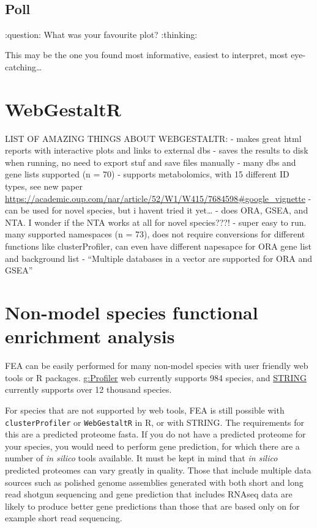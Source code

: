 \documentclass[
]{book}
\begin{document}
~

\hypertarget{poll}{%
\section{Poll}\label{poll}}

:question: What was your favourite plot? :thinking:

This may be the one you found most informative, easiest to interpret, most eye-catching\ldots{}

\hypertarget{webgestaltr}{%
\chapter{WebGestaltR}\label{webgestaltr}}

LIST OF AMAZING THINGS ABOUT WEBGESTALTR:
- makes great html reports with interactive plots and links to external dbs
- saves the results to disk when running, no need to export stuf and save files manually
- many dbs and gene lists supported (n = 70)
- supports metabolomics, with 15 different ID types, see new paper \url{https://academic.oup.com/nar/article/52/W1/W415/7684598\#google_vignette}
- can be used for novel species, but i havent tried it yet\ldots{}
- does ORA, GSEA, and NTA. I wonder if the NTA works at all for novel species???!
- super easy to run. many supported namespaces (n = 73), does not require conversions for different functions like clusterProfiler, can even have different napesapce for ORA gene list and background list
- ``Multiple databases in a vector are supported for ORA and GSEA''

\hypertarget{non-model-species-functional-enrichment-analysis}{%
\chapter{Non-model species functional enrichment analysis}\label{non-model-species-functional-enrichment-analysis}}

FEA can be easily performed for many non-model species with user friendly web tools or R packages. \href{https://biit.cs.ut.ee/gprofiler/gost}{g:Profiler} web currently supports 984 species, and \href{https://string-db.org/}{STRING} currently supports over 12 thousand species.

For species that are not supported by web tools, FEA is still possible with \texttt{clusterProfiler} or \texttt{WebGestaltR} in R, or with STRING. The requirements for this are a predicted proteome fasta. If you do not have a predicted proteome for your species, you would need to perform gene prediction, for which there are a number of \emph{in silico} tools available. It must be kept in mind that \emph{in silico} predicted proteomes can vary greatly in quality. Those that include multiple data sources such as polished genome assemblies generated with both short and long read shotgun sequencing and gene prediction that includes RNAseq data are likely to produce better gene predictions than those that are based only on for example short read sequencing.
\end{document}
